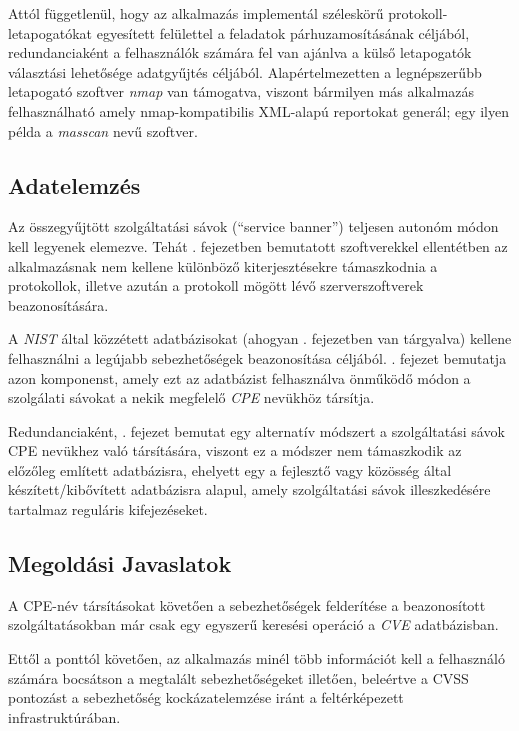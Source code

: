 	Attól függetlenül, hogy az alkalmazás implementál széleskörű protokoll-letapogatókat egyesített felülettel a feladatok párhuzamosításának céljából, redundanciaként a felhasználók számára fel van ajánlva a külső letapogatók választási lehetősége adatgyűjtés céljából. Alapértelmezetten a legnépszerűbb letapogató szoftver \textit{nmap} van támogatva, viszont bármilyen más alkalmazás felhasználható amely nmap-kompatibilis XML-alapú reportokat generál; egy ilyen példa a \textit{masscan} nevű szoftver.

\subsection*{Adatelemzés}

	Az összegyűjtött szolgáltatási sávok (``service banner'') teljesen autonóm módon kell legyenek elemezve. Tehát \az{\ref{relwork}}. fejezetben bemutatott szoftverekkel ellentétben az alkalmazásnak nem kellene különböző kiterjesztésekre támaszkodnia a protokollok, illetve azután a protokoll mögött lévő szerverszoftverek beazonosítására.

	A \textit{NIST} által közzétett adatbázisokat (ahogyan \az{\ref{vulndbs}}. fejezetben van tárgyalva) kellene felhasználni a legújabb sebezhetőségek beazonosítása céljából. \Az{\ref{matchcpe}}. fejezet bemutatja azon komponenst, amely ezt az adatbázist felhasználva önműködő módon a szolgálati sávokat a nekik megfelelő \textit{CPE} nevükhöz társítja.

	Redundanciaként, \az{\ref{patternmatch}}. fejezet bemutat egy alternatív módszert a szolgáltatási sávok CPE nevükhez való társítására, viszont ez a módszer nem támaszkodik az előzőleg említett adatbázisra, ehelyett egy a fejlesztő vagy közösség által készített/kibővített adatbázisra alapul, amely szolgáltatási sávok illeszkedésére tartalmaz reguláris kifejezéseket.

\subsection*{Megoldási Javaslatok}

	A CPE-név társításokat követően a sebezhetőségek felderítése a beazonosított szolgáltatásokban már csak egy egyszerű keresési operáció a \textit{CVE} adatbázisban.
	
	Ettől a ponttól követően, az alkalmazás minél több információt kell a felhasználó számára bocsátson a megtalált sebezhetőségeket illetően, beleértve a CVSS pontozást a sebezhetőség kockázatelemzése iránt a feltérképezett infrastruktúrában.

